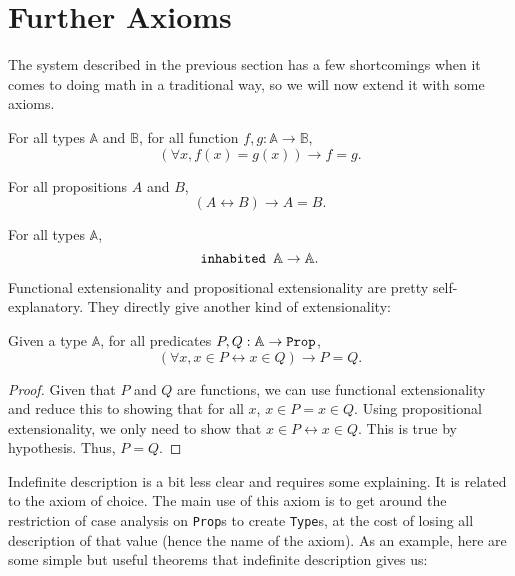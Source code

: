 \documentclass[../math.tex]{subfiles}
\begin{document}
\section{Further Axioms}

The system described in the previous section has a few shortcomings when it
comes to doing math in a traditional way, so we will now extend it with some
axioms.

\begin{axiom}
    For all types $\mathbb A$ and $\mathbb B$, for all function $f, g : \mathbb
    A \rightarrow \mathbb B$,
    \[
        (\forall x, f(x) = g(x)) \rightarrow f = g.
    \]
\end{axiom}

\begin{axiom}
    For all propositions $A$ and $B$,
    \[
        (A \leftrightarrow B) \rightarrow A = B.
    \]
\end{axiom}

\begin{axiom}
    For all types $\mathbb A$,
    \[
        \verb|inhabited | \mathbb A \rightarrow \mathbb A.
    \]
\end{axiom}

Functional extensionality and propositional extensionality are pretty
self-explanatory.  They directly give another kind of extensionality:

\begin{theorem}
    Given a type $\mathbb A$, for all predicates $P, Q : \mathbb A \rightarrow
    \verb|Prop|$,
    \[
        (\forall x, x \in P \leftrightarrow x \in Q) \rightarrow P = Q.
    \]
\end{theorem}
\begin{proof}
    Given that $P$ and $Q$ are functions, we can use functional extensionality
    and reduce this to showing that for all $x$, $x \in P = x \in Q$.  Using
    propositional extensionality, we only need to show that $x \in P
    \leftrightarrow x \in Q$.  This is true by hypothesis.  Thus, $P = Q$.
\end{proof}

Indefinite description is a bit less clear and requires some explaining.  It is
related to the axiom of choice.  The main use of this axiom is to get around the
restriction of case analysis on \verb|Prop|s to create \verb|Type|s, at the cost
of losing all description of that value (hence the name of the axiom).  As an
example, here are some simple but useful theorems that indefinite description
gives us:
\end{document}

